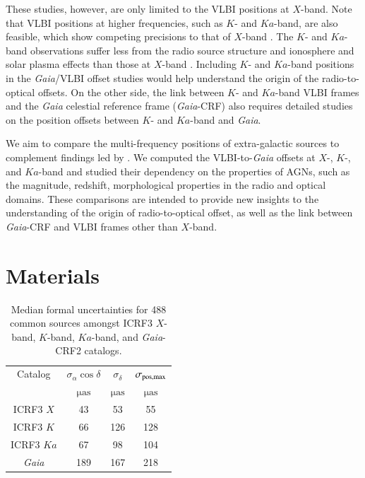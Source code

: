 \documentclass{aa}
\begin{document}
   These studies, however, are only limited to the VLBI positions at $X$-band.
   Note that VLBI positions at higher frequencies, such as $K$- and $Ka$-band, are also feasible, which show competing precisions to that of $X$-band \citep[e.g.,][]{2019evga.confP.302J,2019evga.confP.306D}.
   The $K$- and $Ka$-band observations suffer less from the radio source structure and ionosphere and solar plasma effects than those at $X$-band \citep[e.g.,][]{2002ivsg.conf..350J}.
   Including $K$- and $Ka$-band positions in the \textit{Gaia}/VLBI offset studies would help understand the origin of the radio-to-optical offsets.
   On the other side, the link between $K$- and $Ka$-band VLBI frames and the \textit{Gaia} celestial reference frame (\textit{Gaia}-CRF) also requires detailed studies on the position offsets between $K$- and $Ka$-band and \textit{Gaia}.

   We aim to compare the multi-frequency positions of extra-galactic sources to complement findings led by \citet{2019MNRAS.482.3023P}.
   We computed the VLBI-to-\textit{Gaia} offsets at $X$-, $K$-, and $Ka$-band and studied their dependency on the properties of AGNs, such as the magnitude, redshift, morphological properties in the radio and optical domains.
   These comparisons are intended to provide new insights to the understanding of the origin of radio-to-optical offset, as well as the link between \textit{Gaia}-CRF and VLBI frames other than $X$-band.


\section{Materials}    \label{sec:obs}

    \begin{table}[htbp]
        \centering
        \caption{\label{tab:median-err}
            Median formal uncertainties for 488 common sources amongst ICRF3 $X$-band, $K$-band, $Ka$-band, and \textit{Gaia}-CRF2 catalogs.
        }
        \begin{tabular}{cccc}
            \hline \noalign{\smallskip}
            Catalog &$\sigma_\alpha\cos\delta$  &$\sigma_\delta$  &$\sigma_{\rm pos,max}$\\
            & $\mathrm{\mu as}$ & $\mathrm{\mu as}$  & $\mathrm{\mu as}$ \\
            \noalign{\smallskip}
            \hline
            \noalign{\smallskip}
            ICRF3 $X$      & 43  & 53  & 55  \\
            ICRF3 $K$      & 66  &126  &128  \\
            ICRF3 $Ka$     & 67  & 98  &104  \\
            \textit{Gaia}  &189  &167  &218 \\
            \hline
        \end{tabular}
    \end{table}
\end{document}
